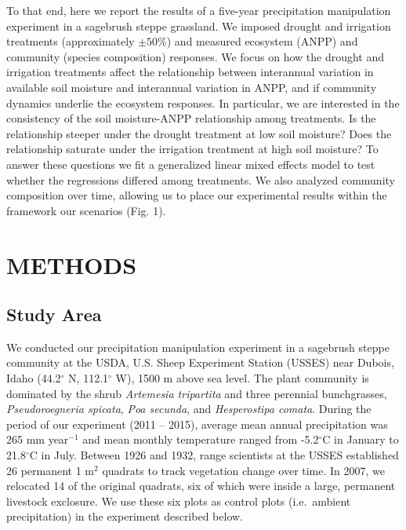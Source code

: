 \documentclass[fleqn,10pt,lineno]{wlpeerj} %
\begin{document}
To that end, here we report the results of a five-year precipitation
manipulation experiment in a sagebrush steppe grassland. We imposed
drought and irrigation treatments (approximately \(\pm50\%\)) and
measured ecosystem (ANPP) and community (species composition) responses.
We focus on how the drought and irrigation treatments affect the
relationship between interannual variation in available soil moisture
and interannual variation in ANPP, and if community dynamics underlie
the ecosystem responses. In particular, we are interested in the
consistency of the soil moisture-ANPP relationship among treatments. Is
the relationship steeper under the drought treatment at low soil
moisture? Does the relationship saturate under the irrigation treatment
at high soil moisture? To answer these questions we fit a generalized
linear mixed effects model to test whether the regressions differed
among treatments. We also analyzed community composition over time,
allowing us to place our experimental results within the framework our
scenarios (Fig. 1).

\section{METHODS}\label{methods}

\subsection{Study Area}\label{study-area}

We conducted our precipitation manipulation experiment in a sagebrush
steppe community at the USDA, U.S. Sheep Experiment Station (USSES) near
Dubois, Idaho (44.2\(^{\circ}\) N, 112.1\(^{\circ}\) W), 1500 m above
sea level. The plant community is dominated by the shrub \emph{Artemesia
tripartita} and three perennial bunchgrasses, \emph{Pseudoroegneria
spicata}, \emph{Poa secunda}, and \emph{Hesperostipa comata}. During the
period of our experiment (2011 -- 2015), average mean annual
precipitation was 265 mm year\(\phantom{}^{-1}\) and mean monthly
temperature ranged from -5.2\(^{\circ}\)C in January to
21.8\(^{\circ}\)C in July. Between 1926 and 1932, range scientists at
the USSES established 26 permanent 1 m\(^2\) quadrats to track
vegetation change over time. In 2007, we relocated 14 of the original
quadrats, six of which were inside a large, permanent livestock
exclosure. We use these six plots as control plots (i.e.~ambient
precipitation) in the experiment described below.
\end{document}
